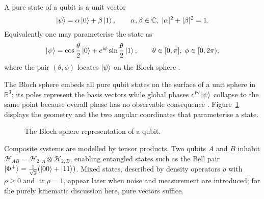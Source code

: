 \begin{definition}\label{def:pure-qubit}
A pure state of a qubit is a unit vector
\[
 \ket{\psi}= \alpha\ket{0}+\beta\ket{1},
 \qquad
 \alpha,\beta\in\mathbb C,\;
 |\alpha|^{2}+|\beta|^{2}=1.
\]
Equivalently one may parameterise the state as
\[
 \ket{\psi}=\cos\frac{\theta}{2}\ket{0}
       +e^{\mathrm i\phi}\sin\frac{\theta}{2}\ket{1},
 \qquad
 \theta\in[0,\pi],\;\phi\in[0,2\pi),
\]
where the pair \((\theta,\phi)\) locates \(\ket{\psi}\) on the Bloch
sphere \cite{nielsen2010quantum}.
\end{definition}

The Bloch sphere embeds all pure qubit states on the surface of a unit
sphere in \(\mathbb R^{3}\); its poles represent the basis vectors while
global phases \(e^{\mathrm i\gamma}\ket{\psi}\) collapse to the same
point because overall phase has no observable consequence
\cite{nielsen2010quantum}. Figure~\ref{fig:bloch_sphere} displays the geometry
and the two angular coordinates that parameterise a state.

\begin{figure}[ht]
 \centering
 \caption{The Bloch sphere representation of a qubit.}
 \label{fig:bloch_sphere}
 \end{figure}

 Composite systems are modelled by tensor products. Two qubits \(A\) and
 \(B\) inhabit
 \(\mathcal H_{AB}=\mathcal H_{2,A}\otimes\mathcal H_{2,B}\), enabling
 entangled states such as the Bell pair
 \(\ket{\Phi^{+}}=\tfrac{1}{\sqrt2}(\ket{00}+\ket{11})\). Mixed states,
 described by density operators \(\rho\) with
 \(\rho\ge0\) and \(\operatorname{tr}\rho=1\), appear later when noise
 and measurement are introduced; for the purely kinematic discussion
 here, pure vectors suffice.
 
